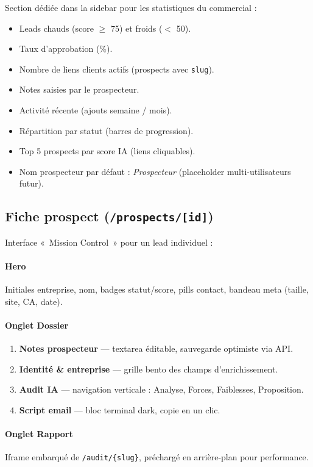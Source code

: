 \documentclass[11pt,a4paper]{report}
\begin{document}
Section dédiée dans la sidebar pour les statistiques du commercial :

\begin{itemize}[leftmargin=*]
  \item Leads chauds (score $\geq$ 75) et froids ($<$ 50).
  \item Taux d'approbation (\%).
  \item Nombre de liens clients actifs (prospects avec \texttt{slug}).
  \item Notes saisies par le prospecteur.
  \item Activité récente (ajouts semaine / mois).
  \item Répartition par statut (barres de progression).
  \item Top 5 prospects par score IA (liens cliquables).
  \item Nom prospecteur par défaut : \emph{Prospecteur} (placeholder multi-utilisateurs futur).
\end{itemize}

\subsection{Fiche prospect (\texttt{/prospects/[id]})}

Interface «~Mission Control~» pour un lead individuel :

\paragraph{Hero}
Initiales entreprise, nom, badges statut/score, pills contact, bandeau meta (taille, site, CA, date).

\paragraph{Onglet Dossier}
\begin{enumerate}[leftmargin=*]
  \item \textbf{Notes prospecteur} --- textarea éditable, sauvegarde optimiste via API.
  \item \textbf{Identité \& entreprise} --- grille bento des champs d'enrichissement.
  \item \textbf{Audit IA} --- navigation verticale : Analyse, Forces, Faiblesses, Proposition.
  \item \textbf{Script email} --- bloc terminal dark, copie en un clic.
\end{enumerate}

\paragraph{Onglet Rapport}
Iframe embarqué de \texttt{/audit/\{slug\}}, préchargé en arrière-plan pour performance.
\end{document}

